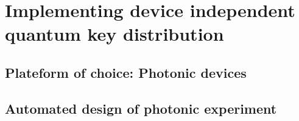 \chapter{Implementing device independent quantum key distribution}

\section{Plateform of choice: Photonic devices}

\section{Automated design of photonic experiment}
